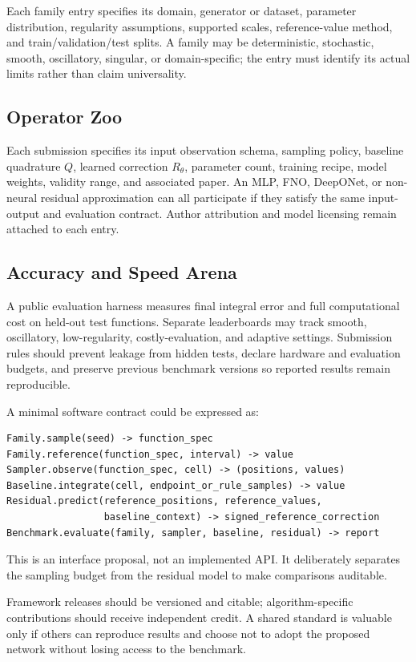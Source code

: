 Each family entry specifies its domain, generator or dataset, parameter
distribution, regularity assumptions, supported scales, reference-value
method, and train/validation/test splits. A family may be deterministic,
stochastic, smooth, oscillatory, singular, or domain-specific; the entry
must identify its actual limits rather than claim universality.

\subsection{Operator Zoo}

Each submission specifies its input observation schema, sampling policy,
baseline quadrature $Q$, learned correction $R_\theta$, parameter count,
training recipe, model weights, validity range, and associated paper.
An MLP, FNO, DeepONet, or non-neural residual approximation can all
participate if they satisfy the same input-output and evaluation contract.
Author attribution and model licensing remain attached to each entry.

\subsection{Accuracy and Speed Arena}

A public evaluation harness measures final integral error and full
computational cost on held-out test functions. Separate leaderboards may
track smooth, oscillatory, low-regularity, costly-evaluation, and adaptive
settings. Submission rules should prevent leakage from hidden tests,
declare hardware and evaluation budgets, and preserve previous benchmark
versions so reported results remain reproducible.

A minimal software contract could be expressed as:
\begin{verbatim}
Family.sample(seed) -> function_spec
Family.reference(function_spec, interval) -> value
Sampler.observe(function_spec, cell) -> (positions, values)
Baseline.integrate(cell, endpoint_or_rule_samples) -> value
Residual.predict(reference_positions, reference_values,
                 baseline_context) -> signed_reference_correction
Benchmark.evaluate(family, sampler, baseline, residual) -> report
\end{verbatim}
This is an interface proposal, not an implemented API. It deliberately
separates the sampling budget from the residual model to make comparisons
auditable.

Framework releases should be versioned and citable; algorithm-specific
contributions should receive independent credit. A shared standard is
valuable only if others can reproduce results and choose not to adopt
the proposed network without losing access to the benchmark.

